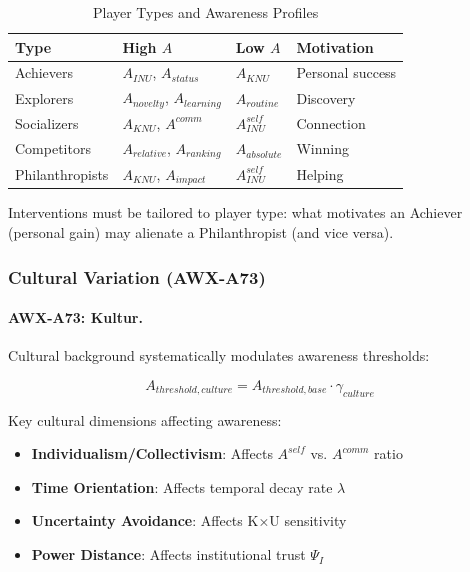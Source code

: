 \begin{table}[htbp]
\centering
\caption{Player Types and Awareness Profiles}
\label{tab:player-types}
\begin{tabular}{@{}llll@{}}
\toprule
\textbf{Type} & \textbf{High $A$} & \textbf{Low $A$} & \textbf{Motivation} \\
\midrule
Achievers & $A_{INU}$, $A_{status}$ & $A_{KNU}$ & Personal success \\
Explorers & $A_{novelty}$, $A_{learning}$ & $A_{routine}$ & Discovery \\
Socializers & $A_{KNU}$, $A^{comm}$ & $A^{self}_{INU}$ & Connection \\
Competitors & $A_{relative}$, $A_{ranking}$ & $A_{absolute}$ & Winning \\
Philanthropists & $A_{KNU}$, $A_{impact}$ & $A^{self}_{INU}$ & Helping \\
\bottomrule
\end{tabular}
\end{table}

Interventions must be tailored to player type: what motivates an Achiever 
(personal gain) may alienate a Philanthropist (and vice versa).

\subsubsection{Cultural Variation (AWX-A73)}

\paragraph{AWX-A73: Kultur.}
Cultural background systematically modulates awareness thresholds:

\begin{equation}
A_{threshold,culture} = A_{threshold,base} \cdot \gamma_{culture}
\end{equation}

Key cultural dimensions affecting awareness:
\begin{itemize}
    \item \textbf{Individualism/Collectivism}: Affects $A^{self}$ vs. $A^{comm}$ ratio
    \item \textbf{Time Orientation}: Affects temporal decay rate $\lambda$
    \item \textbf{Uncertainty Avoidance}: Affects K×U sensitivity
    \item \textbf{Power Distance}: Affects institutional trust $\Psi_I$
\end{itemize}

